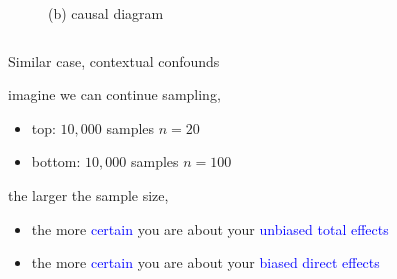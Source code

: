 \begin{frame}
\begin{columns}
\begin{column}{0.5\textwidth}
\begin{figure}
				\caption*{(b) causal diagram}
			\end{figure}
		\end{column}
	\end{columns}
\end{frame}
%
%
\begin{lhframe}[rhgraphic={\texttt{[image: pipefork2b\_samplesize.pdf]}}]
	{Similar case, contextual confounds}
	
	imagine we can continue sampling,
	\begin{itemize}
		\item top: $10,000$ samples $n=20$
		\item bottom: $10,000$ samples $n=100$
	\end{itemize}
	
	the larger the sample size,
	\begin{itemize}
		\item the more \textcolor{blue}{certain} you are about your \textcolor{blue}{unbiased total effects}
		\item the more \textcolor{blue}{certain} you are about your \textcolor{blue}{biased direct effects}
	\end{itemize}
\end{lhframe}
%
%